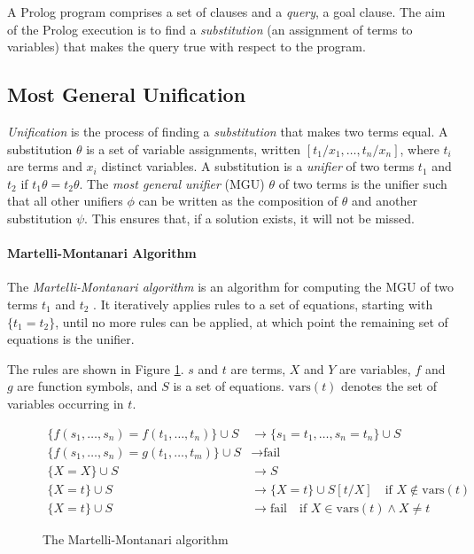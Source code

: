 A Prolog program comprises a set of clauses and a \emph{query}, a goal clause. The aim of the Prolog execution is to find a \emph{substitution} (an assignment of terms to variables) that makes the query true with respect to the program.

\subsection{Most General Unification}

\emph{Unification} is the process of finding a \emph{substitution} that makes two terms equal. A substitution $\theta$ is a set of variable assignments, written $[t_1/x_1, \ldots, t_n/x_n]$, where $t_i$ are terms and $x_i$ distinct variables. A substitution is a \emph{unifier} of two terms $t_1$ and $t_2$ if $t_1\theta = t_2\theta$. The \emph{most general unifier} (MGU) $\theta$ of two terms is the unifier such that all other unifiers $\phi$ can be written as the composition of $\theta$ and another substitution $\psi$. This ensures that, if a solution exists, it will not be missed.

\paragraph{Martelli-Montanari Algorithm}

The \emph{Martelli-Montanari algorithm} is an algorithm for computing the MGU of two terms $t_1$ and $t_2$ \cite{martelliEfficientUnificationAlgorithm1982}. It iteratively applies rules to a set of equations, starting with $\{t_1 = t_2\}$, until no more rules can be applied, at which point the remaining set of equations is the unifier.

The rules are shown in Figure \ref{fig:martelli-montanari}. $s$ and $t$ are terms, $X$ and $Y$ are variables, $f$ and $g$ are function symbols, and $S$ is a set of equations. $\text{vars}(t)$ denotes the set of variables occurring in $t$.

\begin{figure}[H]
\begin{align*}
\{f(s_1, \ldots, s_n) = f(t_1, \ldots, t_n)\} \cup S &\rightarrow \{s_1 = t_1, \ldots, s_n = t_n\} \cup S \\
\{f(s_1, \ldots, s_n) = g(t_1, \ldots, t_m)\} \cup S &\rightarrow \text{fail} \\
\{X = X\} \cup S &\rightarrow S \\
\{X = t\} \cup S &\rightarrow \{X = t\} \cup S[t/X] \quad \text{if } X \notin \text{vars}(t) \\
\{X = t\} \cup S &\rightarrow \text{fail} \quad \text{if } X \in \text{vars}(t) \land X \neq t
\end{align*}
\caption{The Martelli-Montanari algorithm}
\label{fig:martelli-montanari}
\end{figure}

